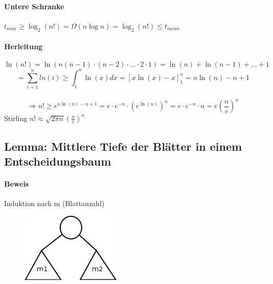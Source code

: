 \vspace{30pt}
\paragraph{Untere Schranke}
$t_{max} \geq \log_2(n!) = \Omega(n \log n) =  \log_2(n!) \leq t_{mean}$
\vspace{90pt}


\paragraph{Herleitung}
\[ \ln(n!) = \ln(n(n-1) \cdot (n-2) \cdot ... \cdot 2 \cdot 1) = \ln(n)+\ln(n-1)+...+1\]
\[ = \sum^{n}_{i=1} ln(i) \geq \int_1^n \ln(x) dx = [x\ln(x)-x]_1^{n} = n\ln(n)-n+1\]\\
\[\Rightarrow n! \geq e^{n\ln(n)-n+1} = e \cdot e^{-n} \cdot (e^{\ln(n)})^n = e \cdot e^{-n} \cdot n = e(\frac{n}{e})^n \] 
Stirling $n! \approx \sqrt{2 \pi n} (\frac{n}{e})^n$

\newpage

\subsection{Lemma: Mittlere Tiefe der Blätter in einem Entscheidungsbaum }

\paragraph{Beweis} Induktion nach m (Blattanzahl)

\begin{figure}
\vspace{-50pt}
\includegraphics[width=\linewidth]{9/Grafik/img2.png}
\caption{}
\end{figure}

